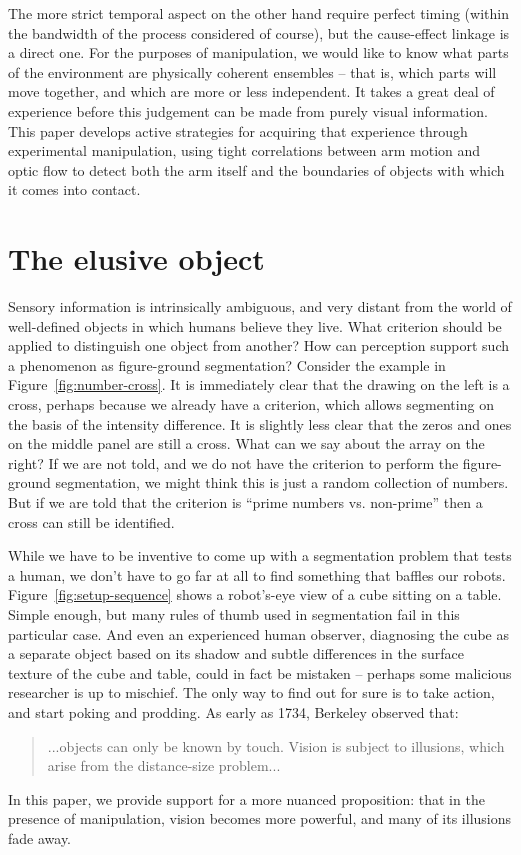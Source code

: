 \ifverbose
The more strict
temporal aspect on the other hand require perfect timing (within the
bandwidth of the process considered of course), but the cause-effect
linkage is a direct one.
For the purposes of manipulation, we would like to know what parts of
the environment are physically coherent ensembles -- that is, which
parts will move together, and which are more or less independent.  It
takes a great deal of experience before this judgement can be made
from purely visual information.  This paper develops active strategies
for acquiring that experience through experimental manipulation, using
tight correlations between arm motion and optic flow to detect both
the arm itself and the boundaries of objects with which it comes into
contact.
\fi




\section{The elusive object}


Sensory information is intrinsically ambiguous, and very distant from
the world of well-defined objects in which humans believe they live.  
What criterion should be applied to distinguish one object from
another?  How can perception support such a phenomenon as figure-ground
segmentation?  
Consider the example in Figure~\ref{fig:number-cross}.  It is
immediately clear that the drawing on the left is a cross, perhaps
because we already have a criterion, which allows segmenting on the
basis of the intensity difference. It is slightly less clear that the
zeros and ones on the middle panel are still a cross. What can we say
about the array on the right? If we are not told, and we do not have
the criterion to perform the figure-ground segmentation, we might
think this is just a random collection of numbers. But if we are told
that the criterion is ``prime numbers vs. non-prime'' then a cross can
still be identified.

While we have to be inventive to come up with a segmentation problem
that tests a human, we don't have to go far at all to find something
that baffles our robots.  Figure~\ref{fig:setup-sequence} shows a
robot's-eye view of a cube sitting on a table.  Simple enough, but
many rules of thumb used in segmentation fail in this particular case.
And even an experienced human observer, diagnosing the cube as a
separate object based on its shadow and subtle differences in the
surface texture of the cube and table, could in fact be mistaken --
perhaps some malicious researcher is up to mischief.  The only way to
find out for sure is to take action, and start poking and prodding.
As early as 1734, Berkeley observed that:
%
\begin{quote}
...objects can only be known by
touch. Vision is subject to illusions, which arise from the
distance-size problem... \cite{berkeley72new}
\end{quote}
%
In this paper, we provide support for a more nuanced proposition: that
in the presence of manipulation, vision becomes more powerful, and many of
its illusions fade away.


